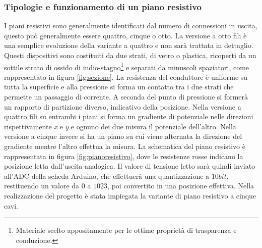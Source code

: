 \documentclass[12pt,twoside,openright]{article}
\begin{document}
\subsubsection{Tipologie e funzionamento di un piano resistivo}\label{tipofunz}
I piani resistivi sono generalmente identificati dal numero di connessioni in uscita, questo può generalmente essere quattro, cinque o otto. La versione a otto fili è una semplice evoluzione della variante a quattro e non sarà trattata in dettaglio. Questi dispositivi sono costituiti da due strati, di vetro o plastica, ricoperti da un sottile strato di ossido di indio-stagno\footnote{Materiale scelto appositamente per le ottime proprietà di trasparenza e conduzione.} e separati da minuscoli spaziatori, come rappresentato in figura \ref{fig:sezione}. 
La resistenza del conduttore è uniforme su tutta la superficie e alla pressione si forma un contatto tra i due strati che permette un passaggio di corrente. A seconda del punto di pressione si formerà un rapporto di partizione diverso, indicativo della posizione.
Nella versione a quattro fili su entrambi i piani si forma un gradiente di potenziale nelle direzioni rispettivamente \emph{x} e \emph{y} e ognuno dei due misura il potenziale dell'altro. Nella versione a cinque invece si ha un piano su cui viene alternata la direzione del gradiente mentre l'altro effettua la misura.\cite{pianoresistivo} La schematica del piano resistivo è rappresentata in figura \ref{fig:pianoresistivo}, dove le resistenze rosse indicano la posizione letta dall'uscita analogica. Il valore di tensione letto sarà quindi inviato all'ADC della scheda Arduino, che effettuerà una quantizzazione a $10bit$, restituendo un valore da $0$ a $1023$, poi convertito in una posizione effettiva.
Nella realizzazione del progetto è stata impiegata la variante di piano resistivo a cinque cavi.
\end{document}

